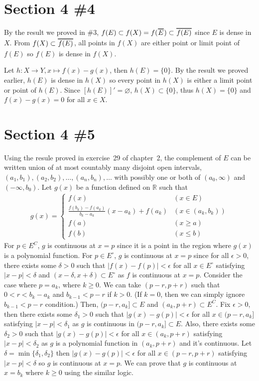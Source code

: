 \documentclass{scrartcl}
\newcommand\Overline[2][0.8pt]{%
  \begin{tikzpicture}[baseline=(a.base)]
    \node[inner xsep=0pt,inner ysep=1.5pt] (a) {$#2$};
    \draw[line width= #1] (a.north west) -- (a.north east);
  \end{tikzpicture}
}
\begin{document}
\section{Section 4 \#4}
By the result we proved in \#3, \(f(E) \subset f(X) = f(\Overline{E}) \subset \Overline{f(E)}\) since \(E\) is dense in \(X\).
From \(f(X) \subset \Overline{f(E)}\), all points in \(f(X)\) are either point or limit point of \(f(E)\) so \(f(E)\) is dense in \(f(X)\).

Let \(h: X \to Y, x \mapsto f(x) - g(x)\), then \(h(E) = \{0\}\).
By the result we proved earlier, \(h(E)\) is dense in \(h(X)\) so every point in \(h(X)\) is either a limit point or point of \(h(E)\).
Since \([h(E)]' = \varnothing\), \(h(X) \subset \{0\}\), thus \(h(X) = \{0\}\) and \(f(x) - g(x) = 0\) for all \(x \in X\).

\section{Section 4 \#5}
Using the resule proved in exercise~29 of chapter~2, the complement of \(E\) can be written union of at most countably many disjoint open intervals, \((a_1, b_1), (a_2, b_2), \dots, (a_n, b_n), \dots\) with possibly one or both of \((a_0, \infty)\) and \((-\infty, b_0)\).
Let \(g(x)\) be a function defined on \(\mathbb{R}\) such that
\begin{align*}
  g(x) = \begin{cases}
    f(x) & (x \in E) \\
    \frac{f(b_k) - f(a_k)}{b_k - a_k} (x - a_k) + f(a_k) & (x \in (a_k, b_k)) \\
    f(a) & (x \geq a) \\
    f(b) & (x \leq b)
  \end{cases}
\end{align*}
For \(p \in E^C\), \(g\) is continuous at \(x = p\) since it is a point in the region where \(g(x)\) is a polynomial function.
For \(p \in E^\circ\), \(g\) is continuous at \(x = p\) since for all \(\epsilon > 0\), there exists some \(\delta > 0\) such that \(|f(x) - f(p)| < \epsilon\) for all \(x \in E^\circ\) satisfying \(|x - p| < \delta\) and \((x - \delta, x + \delta) \subset E^\circ\) as \(f\) is continuous at \(x = p\).
Consider the case where \(p = a_k\), where \(k \geq 0\).
We can take \((p - r, p + r)\) such that \(0 < r < b_k - a_k\) and \(b_{k - 1} < p - r\) if \(k > 0\).
(If \(k = 0\), then we can simply ignore \(b_{k - 1} < p - r\) condition.)
Then, \((p - r, a_k] \subset E\) and \((a_k, p + r) \subset E^C\).
Fix \(\epsilon > 0\), then there exists some \(\delta_1 > 0\) such that \(|g(x) - g(p)| < \epsilon\) for all \(x \in (p - r, a_k]\) satisfying \(|x - p| < \delta_1\) as \(g\) is continuous in \((p - r, a_k] \subset E\).
Also, there exists some \(\delta_2 > 0\) such that \(|g(x) - g(p)| < \epsilon\) for all \(x \in (a_k, p + r)\) satisfying \(|x - p| < \delta_2\) as \(g\) is a polynomial function in \((a_k, p + r)\) and it's continuous.
Let \(\delta = \min \{\delta_1, \delta_2\}\) then \(|g(x) - g(p)| < \epsilon\) for all \(x \in (p - r, p + r)\) satisfying \(|x - p| < \delta\) so \(g\) is continuous at \(x = p\).
We can prove that \(g\) is continuous at \(x = b_k\) where \(k \geq 0\) using the similar logic.
\end{document}
